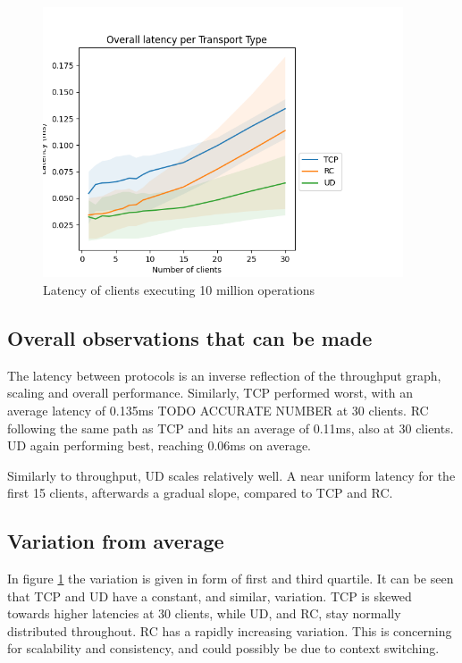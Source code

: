\begin{figure}
    \centering
    \includegraphics[height=80mm]{figures/PNG/Latency_avg_30}
    \caption{Latency of clients executing 10 million operations}
    \label{fig:latency-30}
\end{figure}

\subsection{Overall observations that can be made}
The latency between protocols is an inverse reflection of the throughput graph, scaling and overall performance.
Similarly, TCP performed worst, with an average latency of 0.135ms TODO ACCURATE NUMBER at 30 clients.
RC following the same path as TCP and hits an average of 0.11ms, also at 30 clients.
UD again performing best, reaching 0.06ms on average.

Similarly to throughput, UD scales relatively well.
A near uniform latency for the first 15 clients, afterwards a gradual slope, compared to TCP and RC.

\subsection{Variation from average}
In figure \ref{fig:latency-30} the variation is given in form of first and third quartile.
It can be seen that TCP and UD have a constant, and similar, variation.
TCP is skewed towards higher latencies at 30 clients, while UD, and RC, stay normally distributed throughout.
RC has a rapidly increasing variation.
This is concerning for scalability and consistency, and could possibly be due to context switching.

